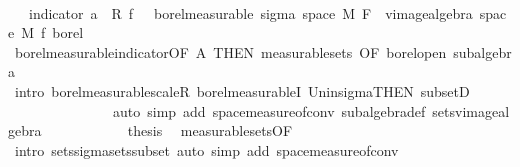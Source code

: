 \begin{isabellebody}
\ \ \ \ \ \ \ \ \isamarkupfalse%
\ {\isacharminus}{\kern0pt}\isanewline
\ \ \ \ \ \ \ \ \ \ \isamarkupfalse%
\ {\isacharasterisk}{\kern0pt}{\isacharcolon}{\kern0pt}\ {\isachardoublequoteopen}{\isacharparenleft}{\kern0pt}{\isasymlambda}{\isasymomega}{\isachardot}{\kern0pt}\ indicator\ a\ {\isasymomega}\ {\isacharasterisk}{\kern0pt}\isactrlsub R\ f\ {\isasymomega}{\isacharparenright}{\kern0pt}\ {\isasymin}\ borel{\isacharunderscore}{\kern0pt}measurable\ {\isacharparenleft}{\kern0pt}sigma\ {\isacharparenleft}{\kern0pt}space\ M{\isacharparenright}{\kern0pt}\ {\isacharparenleft}{\kern0pt}F\ {\isasymunion}\ vimage{\isacharunderscore}{\kern0pt}algebra\ {\isacharparenleft}{\kern0pt}space\ M{\isacharparenright}{\kern0pt}\ f\ borel{\isacharparenright}{\kern0pt}{\isacharparenright}{\kern0pt}{\isachardoublequoteclose}\isanewline
\ \ \ \ \ \ \ \ \ \ \ \ \isamarkupfalse%
\ borel{\isacharunderscore}{\kern0pt}measurable{\isacharunderscore}{\kern0pt}indicator{\isacharbrackleft}{\kern0pt}OF\ A{\isacharparenleft}{\kern0pt}{}{\isacharparenright}{\kern0pt}{\isacharcomma}{\kern0pt}\ THEN\ measurable{\isacharunderscore}{\kern0pt}sets{\isacharcomma}{\kern0pt}\ OF\ borel{\isacharunderscore}{\kern0pt}open{\isacharbrackright}{\kern0pt}\ subalgebra\isanewline
\ \ \ \ \ \ \ \ \ \ \ \ \isamarkupfalse%
\ {\isacharparenleft}{\kern0pt}intro\ borel{\isacharunderscore}{\kern0pt}measurable{\isacharunderscore}{\kern0pt}scaleR\ borel{\isacharunderscore}{\kern0pt}measurableI\ Un{\isacharunderscore}{\kern0pt}in{\isacharunderscore}{\kern0pt}sigma{\isacharbrackleft}{\kern0pt}THEN\ subsetD{\isacharbrackright}{\kern0pt}{\isacharparenright}{\kern0pt}\isanewline
\ \ \ \ \ \ \ \ \ \ \ \ \ \ \ {\isacharparenleft}{\kern0pt}auto\ simp\ add{\isacharcolon}{\kern0pt}\ space{\isacharunderscore}{\kern0pt}measure{\isacharunderscore}{\kern0pt}of{\isacharunderscore}{\kern0pt}conv\ subalgebra{\isacharunderscore}{\kern0pt}def\ sets{\isacharunderscore}{\kern0pt}vimage{\isacharunderscore}{\kern0pt}algebra{}{\isacharparenright}{\kern0pt}\isanewline
\ \ \ \ \ \ \ \ \ \ \isamarkupfalse%
\ {\isacharquery}{\kern0pt}thesis\ \isamarkupfalse%
\ measurable{\isacharunderscore}{\kern0pt}sets{\isacharbrackleft}{\kern0pt}OF\ {\isacharasterisk}{\kern0pt}{\isacharbrackright}{\kern0pt}\ \isamarkupfalse%
\ {\isacharparenleft}{\kern0pt}intro\ sets{\isachardot}{\kern0pt}sigma{\isacharunderscore}{\kern0pt}sets{\isacharunderscore}{\kern0pt}subset{\isacharprime}{\kern0pt}{\isacharcomma}{\kern0pt}\ auto\ simp\ add{\isacharcolon}{\kern0pt}\ space{\isacharunderscore}{\kern0pt}measure{\isacharunderscore}{\kern0pt}of{\isacharunderscore}{\kern0pt}conv{\isacharparenright}{\kern0pt}\isanewline

\end{isabellebody}
